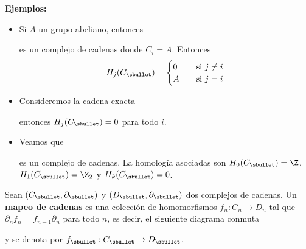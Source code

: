 \documentclass{article}
\begin{document}
\vspace{2mm}
\noindent\textbf{Ejemplos:}
\begin{itemize}
    \item Si $A$ un grupo abeliano, entonces
    
    \vspace{2mm}
    \centerline{
    }
    \vspace{2mm}
    es un complejo de cadenas donde $C_{i}=A$. Entonces
    \begin{equation*}
        H_{j}(C_{\sbullet})=\begin{cases}
            0 & \quad\text{si }j\neq i \\
            A & \quad\text{si }j=i
        \end{cases}
    \end{equation*}

    \item Consideremos la cadena exacta
    
    \vspace{2mm}
    \centerline{
    }
    \vspace{2mm}
    entonces $H_{j}(C_{\sbullet})=0$ para todo $i$.

    \item Veamos que
    
    \vspace{2mm}
    \centerline{
    }
    \vspace{2mm}    
    es un complejo de cadenas. La homología asociadas son $H_{0}(C_{\sbullet})=\Z$, 
    $H_{1}(C_{\sbullet})=\Z_{2}$ y $H_{k}(C_{\sbullet})=0$.
\end{itemize}

\begin{dfn}
    Sean $(C_{\sbullet},\partial_{\sbullet})$ y $(D_{\sbullet},\partial_{\sbullet})$ dos complejos 
    de cadenas. Un \textbf{mapeo de cadenas} es una colección de homomorfismos 
    $f_{n}:C_{n}\to D_{n}$ tal que $\partial_{n}f_{n}=f_{n-1}\partial_{n}$ para todo $n$, es 
    decir, el siguiente diagrama conmuta

    \vspace{2mm}
    \centerline{
    }
    \noindent y se denota por $f_{\sbullet}:C_{\sbullet}\to D_{\sbullet}$.
\end{dfn}
\end{document}
